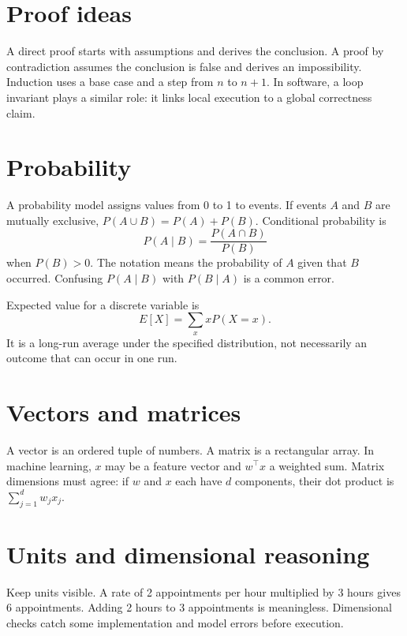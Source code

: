 \section{Proof ideas}
A direct proof starts with assumptions and derives the conclusion. A proof by contradiction assumes the conclusion is false and derives an impossibility. Induction uses a base case and a step from $n$ to $n+1$. In software, a loop invariant plays a similar role: it links local execution to a global correctness claim.

\section{Probability}
A probability model assigns values from 0 to 1 to events. If events $A$ and $B$ are mutually exclusive, $P(A\cup B)=P(A)+P(B)$. Conditional probability is
\[
P(A\mid B)=\frac{P(A\cap B)}{P(B)}
\]
when $P(B)>0$. The notation means the probability of $A$ given that $B$ occurred. Confusing $P(A\mid B)$ with $P(B\mid A)$ is a common error.

Expected value for a discrete variable is
\[
E[X]=\sum_x xP(X=x).
\]
It is a long-run average under the specified distribution, not necessarily an outcome that can occur in one run.

\section{Vectors and matrices}
A vector is an ordered tuple of numbers. A matrix is a rectangular array. In machine learning, $x$ may be a feature vector and $w^\top x$ a weighted sum. Matrix dimensions must agree: if $w$ and $x$ each have $d$ components, their dot product is $\sum_{j=1}^{d}w_jx_j$.

\section{Units and dimensional reasoning}
Keep units visible. A rate of 2 appointments per hour multiplied by 3 hours gives 6 appointments. Adding 2 hours to 3 appointments is meaningless. Dimensional checks catch some implementation and model errors before execution.
